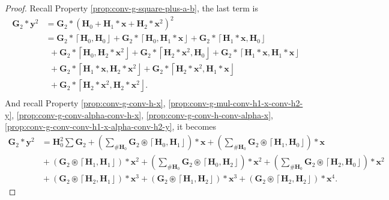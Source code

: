 \documentclass[twoside,11pt]{article}
\def\oconv{\circledast}
\def\dsmark{{\scriptstyle \#}}
\def\tvar#1{\mathbf{#1}} %
\def\lcerfl#1{\left\lceil{#1}\right\rfloor}
\begin{document}
\begin{proof}
  Recall Property \ref{prop:conv-g-square-plus-a-b}, the last term is
  \begin{equation*}
    \begin{aligned}
      \tvar{G}_2 * \tvar{y}^2
       & = \tvar{G}_2 * \left(\tvar{H}_0 + \tvar{H}_1 * \tvar{x} + \tvar{H}_2 * \tvar{x}^2 \right)^2 \\
       & = \tvar{G}_2 * \lcerfl{\tvar{H}_0, \tvar{H}_0}
      + \tvar{G}_2 * \lcerfl{\tvar{H}_0, \tvar{H}_1 * \tvar{x}}
      + \tvar{G}_2 * \lcerfl{\tvar{H}_1 * \tvar{x}, \tvar{H}_0}                                      \\
       & ~~
      + \tvar{G}_2 * \lcerfl{\tvar{H}_0, \tvar{H}_2 * \tvar{x}^2}
      + \tvar{G}_2 * \lcerfl{\tvar{H}_2 * \tvar{x}^2, \tvar{H}_0}
      + \tvar{G}_2 * \lcerfl{\tvar{H}_1 * \tvar{x}, \tvar{H}_1 * \tvar{x}}                           \\
       & ~~
      + \tvar{G}_2 * \lcerfl{\tvar{H}_1 * \tvar{x}, \tvar{H}_2 * \tvar{x}^2}
      + \tvar{G}_2 * \lcerfl{\tvar{H}_2 * \tvar{x}^2, \tvar{H}_1 * \tvar{x}}                         \\
       & ~~
      + \tvar{G}_2 * \lcerfl{\tvar{H}_2 * \tvar{x}^2, \tvar{H}_2 * \tvar{x}^2}.                      \\
    \end{aligned}
  \end{equation*}
  And recall Property
  \ref{prop:conv-g-conv-h-x},
  \ref{prop:conv-g-mul-conv-h1-x-conv-h2-y},
  \ref{prop:conv-g-conv-alpha-conv-h-x},
  \ref{prop:conv-g-conv-h-conv-alpha-x},
  \ref{prop:conv-g-conv-conv-h1-x-alpha-conv-h2-y}, it becomes
  \begin{equation*}
    \begin{aligned}
      \tvar{G}_2 * \tvar{y}^2
       & = \tvar{H}^2_0 \sum \tvar{G}_2
      + \left(\sum_{\dsmark \tvar{H}_0} \tvar{G}_2 \oconv \lcerfl{\tvar{H}_0, \tvar{H}_1} \right) * \tvar{x}
      + \left(\sum_{\dsmark \tvar{H}_0} \tvar{G}_2 \oconv \lcerfl{\tvar{H}_1, \tvar{H}_0} \right) * \tvar{x}   \\
       & \!\!\!\!\!\!\!
      + (\tvar{G}_2 \oconv \lcerfl{\tvar{H}_1, \tvar{H}_1}) * \tvar{x}^2
      + \left(\sum_{\dsmark \tvar{H}_0} \tvar{G}_2 \oconv \lcerfl{\tvar{H}_0, \tvar{H}_2} \right) * \tvar{x}^2
      + \left(\sum_{\dsmark \tvar{H}_0} \tvar{G}_2 \oconv \lcerfl{\tvar{H}_2, \tvar{H}_0} \right) * \tvar{x}^2 \\
       & \!\!\!\!\!\!\!
      + (\tvar{G}_2 \oconv \lcerfl{\tvar{H}_2, \tvar{H}_1}) * \tvar{x}^3
      + (\tvar{G}_2 \oconv \lcerfl{\tvar{H}_1, \tvar{H}_2}) * \tvar{x}^3
      + (\tvar{G}_2 \oconv \lcerfl{\tvar{H}_2, \tvar{H}_2}) * \tvar{x}^4.
    \end{aligned}
  \end{equation*}


\end{proof}
\end{document}
